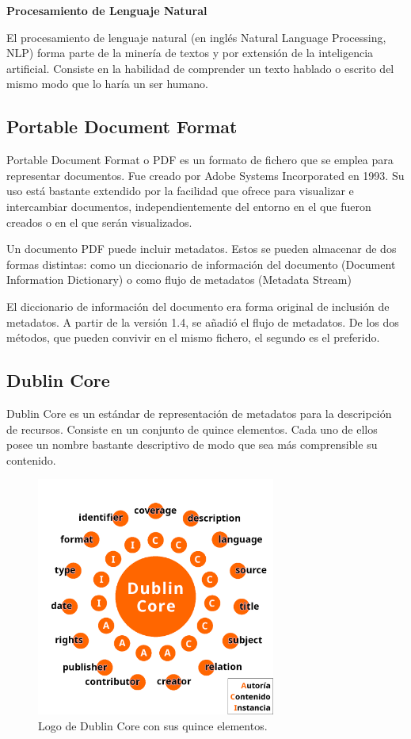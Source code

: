 \documentclass[../main.tex]{subfiles}
\begin{document}
\textbf{Procesamiento de Lenguaje Natural}

El procesamiento de lenguaje natural (en inglés Natural Language Processing, NLP) forma parte de la minería de textos y por extensión de la inteligencia artificial. Consiste en la habilidad de comprender un texto hablado o escrito del mismo modo que lo haría un ser humano.


\subsection{Portable Document Format}

Portable Document Format o PDF es un formato de fichero que se emplea para representar documentos. Fue creado por Adobe Systems Incorporated en 1993. Su uso está bastante extendido por la facilidad que ofrece para visualizar e intercambiar documentos, independientemente del entorno en el que fueron creados o en el que serán visualizados.

Un documento PDF puede incluir metadatos. Estos se pueden almacenar de dos formas distintas: como un diccionario de información del documento (Document Information Dictionary) o como flujo de metadatos (Metadata Stream)

El diccionario de información del documento era forma original de inclusión de metadatos. A partir de la versión 1.4, se añadió el flujo de metadatos. De los dos métodos, que pueden convivir en el mismo fichero, el segundo es el preferido.


\subsection{Dublin Core}

Dublin Core es un estándar de representación de metadatos para la descripción de recursos. Consiste en un conjunto de quince elementos. Cada uno de ellos posee un nombre bastante descriptivo de modo que sea más comprensible su contenido.

\begin{figure}[h]
  \centering
  \includegraphics[width=0.7\textwidth]{../images/dublincore.png}
  \caption{Logo de Dublin Core con sus quince elementos.}
\end{figure}
\end{document}

